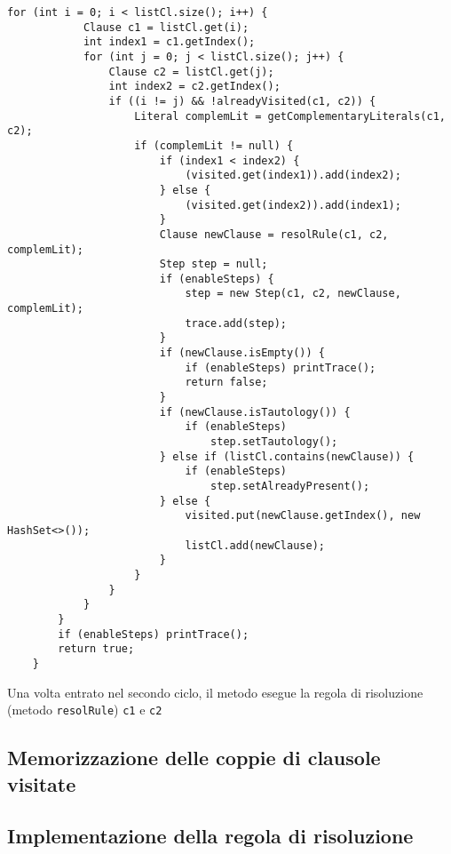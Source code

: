 \documentclass[a4paper,12pt]{report}
\begin{document}
\begin{lstlisting}[caption={Metodo ``isSatisfiable'' della classe Resolution}, label={double-for}]
        for (int i = 0; i < listCl.size(); i++) {
            Clause c1 = listCl.get(i);
            int index1 = c1.getIndex();
            for (int j = 0; j < listCl.size(); j++) {
                Clause c2 = listCl.get(j);
                int index2 = c2.getIndex();
                if ((i != j) && !alreadyVisited(c1, c2)) {
                    Literal complemLit = getComplementaryLiterals(c1, c2);
                    if (complemLit != null) {
                        if (index1 < index2) {
                            (visited.get(index1)).add(index2);
                        } else {
                            (visited.get(index2)).add(index1);
                        }
                        Clause newClause = resolRule(c1, c2, complemLit);
                        Step step = null;
                        if (enableSteps) {
                            step = new Step(c1, c2, newClause, complemLit);
                            trace.add(step);
                        }
                        if (newClause.isEmpty()) {
                            if (enableSteps) printTrace();
                            return false;
                        } 
                        if (newClause.isTautology()) {
                            if (enableSteps)
                                step.setTautology();
                        } else if (listCl.contains(newClause)) {
                            if (enableSteps)
                                step.setAlreadyPresent();
                        } else {
                            visited.put(newClause.getIndex(), new HashSet<>());
                            listCl.add(newClause);
                        }
                    }
                }
            }
        }
        if (enableSteps) printTrace();
        return true;
    }
\end{lstlisting}

Una volta entrato nel secondo ciclo, il metodo esegue la regola di risoluzione (metodo \texttt{resolRule}) \texttt{c1} e \texttt{c2} 

\subsection{Memorizzazione delle coppie di clausole visitate}
\label{visited}
\subsection{Implementazione della regola di risoluzione}
\label{resolRule}
\end{document}
